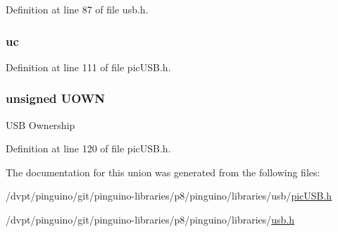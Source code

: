 Definition at line 87 of file usb.\-h.

\hypertarget{union_b_d_stat_a4fd6f18f3eba5c2129d04a50fe51778f}{
\subsubsection[{uc}]{ uc}}\label{union_b_d_stat_a4fd6f18f3eba5c2129d04a50fe51778f}


Definition at line 111 of file pic\-U\-S\-B.\-h.

\hypertarget{union_b_d_stat_abc982c28d59f8e36dbcb06639010169d}{
\subsubsection[{U\-O\-W\-N}]{\setlength{\rightskip}{0pt plus 5cm}unsigned U\-O\-W\-N}}\label{union_b_d_stat_abc982c28d59f8e36dbcb06639010169d}
U\-S\-B Ownership 

Definition at line 120 of file pic\-U\-S\-B.\-h.



The documentation for this union was generated from the following files\-:\begin{DoxyCompactItemize}
\item 
/dvpt/pinguino/git/pinguino-\/libraries/p8/pinguino/libraries/usb/\hyperlink{pic_u_s_b_8h}{pic\-U\-S\-B.\-h}\item 
/dvpt/pinguino/git/pinguino-\/libraries/p8/pinguino/libraries/\hyperlink{usb_8h}{usb.\-h}\end{DoxyCompactItemize}
